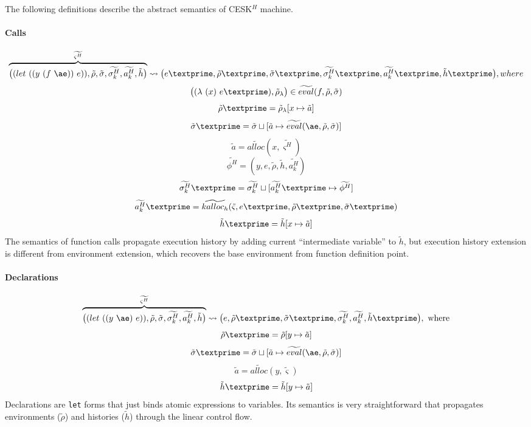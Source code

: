 \documentclass[12pt]{report}
\begin{document}
The following definitions describe the abstract semantics of CESK$^H$ machine.

\paragraph{Calls}
\[
\overbrace{
\big((let\ ((y\ (f\ \ae))\ e)), \tilde{\rho}, \tilde{\sigma}, \widetilde{\sigma^H_k}, \widetilde{a^H_k}, \tilde{h} \big)
}^{\widetilde{\varsigma^H}}
\leadsto \big(e\textprime,\tilde{\rho}\textprime, \tilde{\sigma}\textprime, \widetilde{\sigma_k^H}\textprime, \widetilde{a_k^H}\textprime, \tilde{h}\textprime \big), where
\]
\[
\big((\lambda\ (x)\ e\textprime), \tilde{\rho}_{\lambda}  \big) \in \widetilde{eval}(f, \tilde{\rho}, \tilde{\sigma})
\]
\[
\tilde{\rho}\textprime = \tilde{\rho}_{\lambda}[x \mapsto \tilde{a}]
\]
\[
\tilde{\sigma}\textprime = \tilde{\sigma} \sqcup [\tilde{a} \mapsto \widetilde{eval}(\ae, \tilde{\rho}, \tilde{\sigma})]
\]
\[
\tilde{a} = \widetilde{alloc}(x, \widetilde{\varsigma^H})
\]
\[
\widetilde{\phi^H} = {(y, e, \tilde{\rho}, \tilde{h}, \widetilde{a_k^H})}
\]
\[
\widetilde{\sigma_k^H}\textprime = \widetilde{\sigma_k^H} \sqcup [\widetilde{a_k^H}\textprime \mapsto \widetilde{\phi^H}]
\]
\[
\widetilde{a_k^H}\textprime = \widetilde{kalloc_h}(\tilde{\varsigma}, e\textprime, \tilde{\rho}\textprime, \tilde{\sigma}\textprime)
\]
\[
\tilde{h}\textprime = \tilde{h}[x \mapsto \tilde{a}]
\]
The semantics of function calls propagate execution history by adding current ``intermediate variable'' to $\tilde{h}$, but execution history extension is different from environment extension, which recovers the base environment from function definition point.

\paragraph{Declarations}
\[
\overbrace{
\big((let\ ((y\ \ae)\ e)), \tilde{\rho}, \tilde{\sigma}, \widetilde{\sigma^H_k}, \widetilde{a^H_k}, \tilde{h} \big)
}^{\widetilde{\varsigma^H}}
\leadsto \big(e,\tilde{\rho}\textprime, \tilde{\sigma}\textprime, \widetilde{\sigma^H_k}, \widetilde{a^H_k}, \tilde{h}\textprime \big), \mbox{ where}
\]
\[
\tilde{\rho}\textprime = \tilde{\rho}[y \mapsto \tilde{a}]
\]
\[
\tilde{\sigma}\textprime = \tilde{\sigma} \sqcup [\tilde{a} \mapsto \widetilde{eval}(\ae, \tilde{\rho}, \tilde{\sigma})]
\]
\[
\tilde{a} = \widetilde{alloc}(y, \tilde{\varsigma})
\]
\[
\tilde{h}\textprime = \tilde{h}[y \mapsto \tilde{a}]
\]
Declarations are \verb|let| forms that just binds atomic expressions to variables.
Its semantics is very straightforward that propagates environments ($\tilde{\rho}$) and histories ($\tilde{h}$) through the linear control flow.
\end{document}
